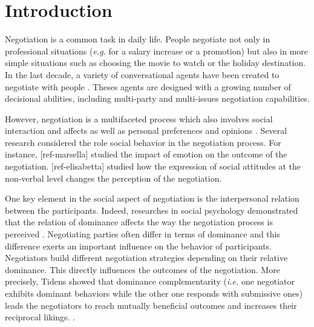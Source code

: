 \documentclass[sigconf]{aamas}  %
\begin{document}
	
	
	\maketitle
	
	
	
	\section{Introduction}
	Negotiation is a common task in daily life. People negotiate not only in professional situations (\emph{e.g.} for a salary increase or a promotion) but also in more simple situations such as choosing the movie to watch or the holiday destination. In the last decade, a variety of conversational agents have been created to negotiate with people \cite{pynadath2013you,gratch2016misrepresentation,klatt2011negotiations}. Theses agents are designed with a growing number of decisional abilities, including multi-party and multi-issues negotiation capabilities.
	
	However, negotiation is a multifaceted process which also involves social interaction and affects as well as personal preferences and opinions  \cite{bro2010affective}. Several research considered the role social behavior in the negotiation process. For instance, [ref-marsella] studied the impact of emotion on the outcome of the negotiation. [ref-elisabetta] studied how the expression of social attitudes at the non-verbal level changes the perception of the negotiation.
	
	One key element in the social aspect of negotiation is the interpersonal relation between the participants. Indeed, researches in social psychology demonstrated that the relation of dominance affects the way the negotiation process is perceived \cite{van2006power}. Negotiating parties often differ in terms of dominance and this difference exerts an important influence on the behavior of participants. Negotiators build different negotiation strategies depending on their relative dominance. This directly influences the outcomes of the negotiation. More precisely, Tidens \cite{tiedens2003power} showed that dominance complementarity (\emph{i.e.} one negotiator exhibits dominant behaviors while the other one responds with submissive ones) leads the negotiators to reach mutually beneficial outcomes and increases their reciprocal likings. \cite{wiltermuth2015benefits,tiedens2003power}.
	
\end{document}
